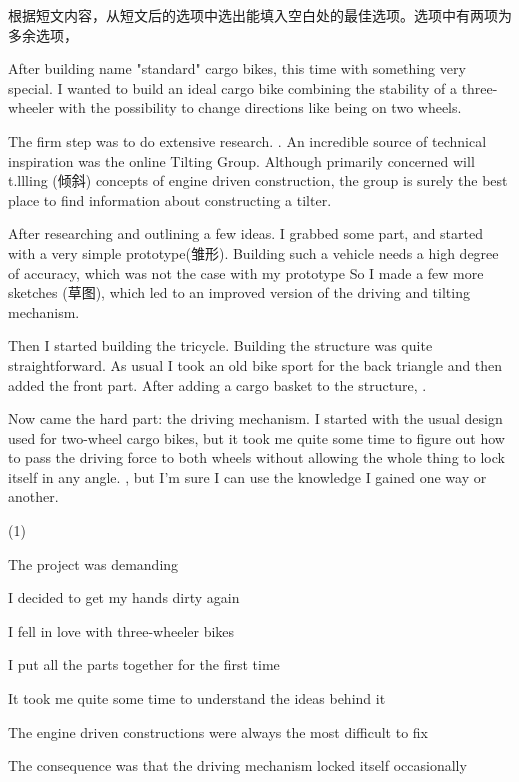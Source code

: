 \documentclass{英语试卷}
\begin{document}
\par 根据短文内容，从短文后的选项中选出能填入空白处的最佳选项。选项中有两项为多余选项，\par
\par After building name "standard" cargo bikes,  this time with something very special. I wanted to build an ideal cargo bike combining the stability of a three-wheeler with the possibility to change directions like being on two wheels.\par
\par The firm step was to do extensive research. . An incredible source of technical inspiration was the online Tilting Group. Although primarily concerned will t.llling (倾斜) concepts of engine driven construction, the group is surely the best place to find information about constructing a tilter.\par
\par After researching and outlining a few ideas. I grabbed some part, and started with a very simple prototype(雏形). Building such a vehicle needs a high degree of accuracy, which was not the case with my prototype  So I made a few more sketches (草图), which led to an improved version of the driving and tilting mechanism.\par
\par Then I started building the tricycle. Building the structure was quite straightforward. As usual I took an old bike sport for the back triangle and then added the front part. After adding a cargo basket to the structure, .\par
\par Now came the hard part: the driving mechanism. I started with the usual design used for two-wheel cargo bikes, but it took me quite some time to figure out how to pass the driving force to both wheels without allowing the whole thing to lock itself in any angle. , but I'm sure I can use the knowledge I gained one way or another.\par
\begin{choices}(1)
  \item The project was demanding
  \item I decided to get my hands dirty again
  \item I fell in love with three-wheeler bikes
  \item I put all the parts together for the first time
  \item It took me quite some time to understand the ideas behind it
  \item The engine driven constructions were always the most difficult to fix
  \item The consequence was that the driving mechanism locked itself occasionally
\end{choices}
\end{document}
